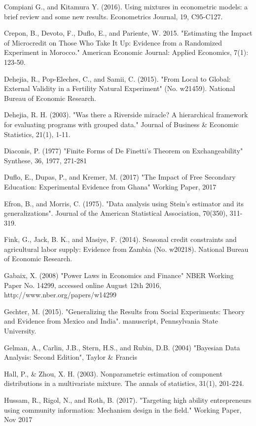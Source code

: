 \documentclass[english,12pt]{article}\usepackage{lmodern}
\numberwithin{equation}{section}
\begin{document}
\begin{thebibliography}{99}
 Compiani G., and Kitamura Y. (2016). Using mixtures in econometric models: a brief review and some new results. Econometrics Journal, 19, C95-C127.

 Crepon, B., Devoto, F., Duflo, E., and Pariente, W. 2015. "Estimating the Impact of Microcredit on Those Who Take It Up: Evidence from a Randomized Experiment in Morocco." American Economic Journal: Applied Economics, 7(1): 123-50.

 Dehejia, R., Pop-Eleches, C., and Samii, C. (2015). "From Local to Global: External Validity in a Fertility Natural Experiment" (No. w21459). National Bureau of Economic Research.

 Dehejia, R. H. (2003). "Was there a Riverside miracle? A hierarchical framework for evaluating programs with grouped data." Journal of Business \& Economic Statistics, 21(1), 1-11.

 Diaconis, P. (1977) "Finite Forms of De Finetti's Theorem on Exchangeability" Synthese, 36, 1977,  271-281

 Duflo, E., Dupas, P., and Kremer, M. (2017) "The Impact of Free Secondary Education: Experimental Evidence from Ghana" Working Paper, 2017

 Efron, B., and Morris, C. (1975). "Data analysis using Stein's estimator and its generalizations". Journal of the American Statistical Association, 70(350), 311-319.

 Fink, G., Jack, B. K., and Masiye, F. (2014). Seasonal credit constraints and agricultural labor supply: Evidence from Zambia (No. w20218). National Bureau of Economic Research.

 Gabaix, X. (2008) "Power Laws in Economics and Finance" NBER Working Paper No. 14299, accessed online August 12th 2016, http://www.nber.org/papers/w14299

 Gechter, M. (2015). "Generalizing the Results from Social Experiments: Theory and Evidence from Mexico and India". manuscript, Pennsylvania State University.

 Gelman, A., Carlin, J.B., Stern, H.S., and Rubin, D.B. (2004) "Bayesian Data Analysis: Second Edition", Taylor \& Francis

 Hall, P., \& Zhou, X. H. (2003). Nonparametric estimation of component distributions in a multivariate mixture. The annals of statistics, 31(1), 201-224.

 Hussam, R., Rigol, N., and Roth, B. (2017). "Targeting high ability entrepreneurs using community information: Mechanism design in the field." Working Paper, Nov 2017


\end{thebibliography}
\end{document}
